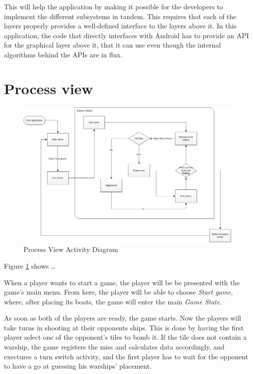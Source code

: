 
This will help the application by making it possible for the developers to implement the different subsystems in tandem. This requires that each of the layers properly provides a well-defined interface to the layers above it. In this application, the code that directly interfaces with Android has to provide an API for the graphical layer above it, that it can use even though the internal algorithms behind the APIs are in flux.


\section{Process view}
    
\begin{figure}[ht]
    \includegraphics[angle=90, scale=0.8]{ProcessLayer.png}
    \caption{Process View Activity Diagram}
    \label{fig:ActivityDiagram}
\end{figure}

Figure \ref{fig:ActivityDiagram} shows …

When a player wants to start a game, the player will be be presented with the game's main menu. From here, the player will be able to choose \emph{Start game}, where, after placing its boats, the game will enter the main \emph{Game State}.

As soon as both of the players are ready, the game starts. Now the players will take turns in shooting at their opponents ships. This is done by having the first player select one of the opponent's tiles to bomb it. If the tile does not contain a warship, the game registers the miss and calculates data accordingly, and exectures a turn switch activity, and the first player has to wait for the opponent to have a go at guessing his warships' placement.

